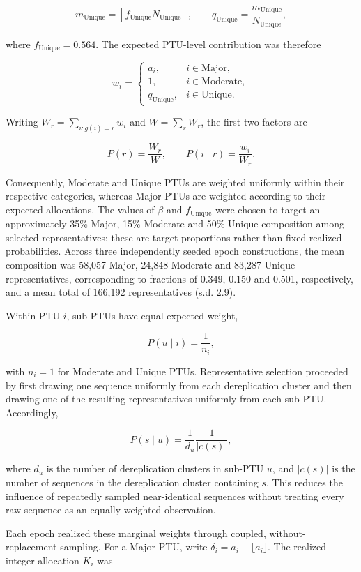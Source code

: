 \[
m_{\mathrm{Unique}}
=\left\lfloor f_{\mathrm{Unique}}N_{\mathrm{Unique}}\right\rfloor,
\qquad
q_{\mathrm{Unique}}
=\frac{m_{\mathrm{Unique}}}{N_{\mathrm{Unique}}},
\]

where \(f_{\mathrm{Unique}}=0.564\). The expected PTU-level contribution was
therefore

\[
w_i=
\begin{cases}
a_i, & i\in\mathrm{Major},\\
1, & i\in\mathrm{Moderate},\\
q_{\mathrm{Unique}}, & i\in\mathrm{Unique}.
\end{cases}
\]

Writing \(W_r=\sum_{i:g(i)=r}w_i\) and \(W=\sum_r W_r\), the first two factors
are

\[
P(r)=\frac{W_r}{W},
\qquad
P(i\mid r)=\frac{w_i}{W_r}.
\]

Consequently, Moderate and Unique PTUs are weighted uniformly within their
respective categories, whereas Major PTUs are weighted according to their expected
allocations. The values of \(\beta\) and \(f_{\mathrm{Unique}}\) were chosen to
target an approximately 35\% Major, 15\% Moderate and 50\% Unique composition
among selected representatives; these are target proportions rather than fixed
realized probabilities. Across three independently seeded epoch constructions,
the mean composition was 58,057 Major, 24,848 Moderate and 83,287 Unique
representatives, corresponding to fractions of 0.349, 0.150 and 0.501,
respectively, and a mean total of 166,192 representatives (s.d. 2.9).

Within PTU \(i\), sub-PTUs have equal expected weight,

\[
P(u\mid i)=\frac{1}{n_i},
\]

with \(n_i=1\) for Moderate and Unique PTUs. Representative selection proceeded
by first drawing one sequence uniformly from each dereplication cluster and
then drawing one of the resulting representatives uniformly from each sub-PTU.
Accordingly,

\[
P(s\mid u)
=
\frac{1}{d_u}\frac{1}{|c(s)|},
\]

where \(d_u\) is the number of dereplication clusters in sub-PTU \(u\), and
\(|c(s)|\) is the number of sequences in the dereplication cluster containing
\(s\). This reduces the influence of repeatedly sampled near-identical
sequences without treating every raw sequence as an equally weighted
observation.

Each epoch realized these marginal weights through coupled,
without-replacement sampling. For a Major PTU, write
\(\delta_i=a_i-\lfloor a_i\rfloor\). The realized integer allocation \(K_i\)
was

